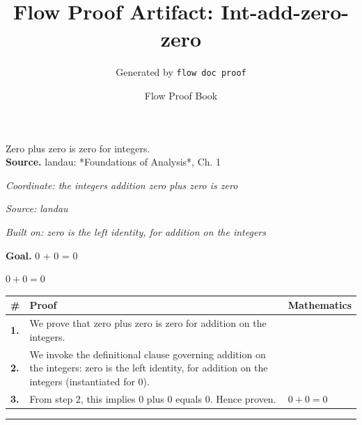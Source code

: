 \documentclass[11pt]{article}
\title{Flow Proof Artifact: Int-add-zero-zero}
\author{Generated by \texttt{flow doc proof}}
\date{Flow Proof Book}
\theoremstyle{definition}
\begin{document}
\maketitle
Zero plus zero is zero for integers.\\[0.5em]
\textbf{Source.} landau: *Foundations of Analysis*, Ch. 1\\[0.5em]
\bigskip
{}\par
\smallskip\noindent\textit{Coordinate: the integers \cdot addition \cdot zero plus zero is zero}\par
\smallskip\noindent\textit{Source: landau}\par
\smallskip\noindent\textit{Built on: zero is the left identity, for addition on the integers}\par
\medskip
\noindent\textbf{Goal.} 0 + 0 = 0\par
\noindent$\displaystyle 0 + 0 = 0$\par
\medskip
\noindent
\begin{tabular}{@{} >{\raggedright\arraybackslash}p{} >{\raggedright\arraybackslash}p{} >{\raggedleft\arraybackslash}p{} @{}}
\textbf{\#} & \textbf{Proof} & \textbf{Mathematics} \\
\midrule
\textbf{1.} & We prove that zero plus zero is zero for addition on the integers. & \\[0.45em]
\textbf{2.} & We invoke the definitional clause governing addition on the integers: zero is the left identity, for addition on the integers (instantiated for 0). & \\[0.45em]
\textbf{3.} & From step 2, this implies 0 plus 0 equals 0. Hence proven. & $\displaystyle 0 + 0 = 0$ \\[0.45em]
\bottomrule
\end{tabular}
\label{thm:Int-addition-zero_plus_zero_is_zero}
\par\medskip\hrule
\end{document}
